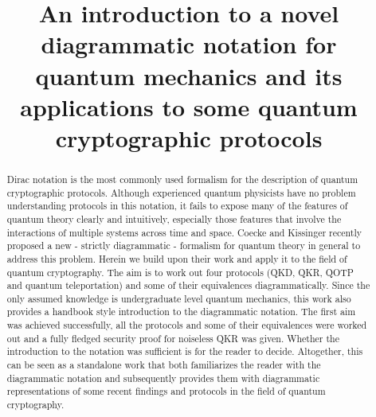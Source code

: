 \documentclass[]{article}
\title{An introduction to a novel diagrammatic notation for quantum mechanics and its applications to some quantum cryptographic protocols}
\author{}
\begin{document}
\maketitle

\begin{abstract}

Dirac notation is the most commonly used formalism for the description of quantum cryptographic protocols. Although experienced quantum physicists have no problem understanding protocols in this notation, it fails to expose many of the features of quantum theory clearly and intuitively, especially those features that involve the interactions of multiple systems across time and space. Coecke and Kissinger recently proposed \cite{Coecke2017} a new - strictly diagrammatic - formalism for quantum theory in general to address this problem. Herein we build upon their work and apply it to the field of quantum cryptography. The aim is to work out four protocols (QKD, QKR, QOTP and quantum teleportation) and some of their equivalences diagrammatically. Since the only assumed knowledge is undergraduate level quantum mechanics, this work also provides a handbook style introduction to the diagrammatic notation. The first aim was achieved successfully, all the protocols and some of their equivalences were worked out and a fully fledged security proof for noiseless QKR was given. Whether the introduction to the notation was sufficient is for the reader to decide. Altogether, this can be seen as a standalone work that both familiarizes the reader with the diagrammatic notation and subsequently provides them with diagrammatic representations of some recent findings and protocols in the field of quantum cryptography.


\end{abstract}
\end{document}
